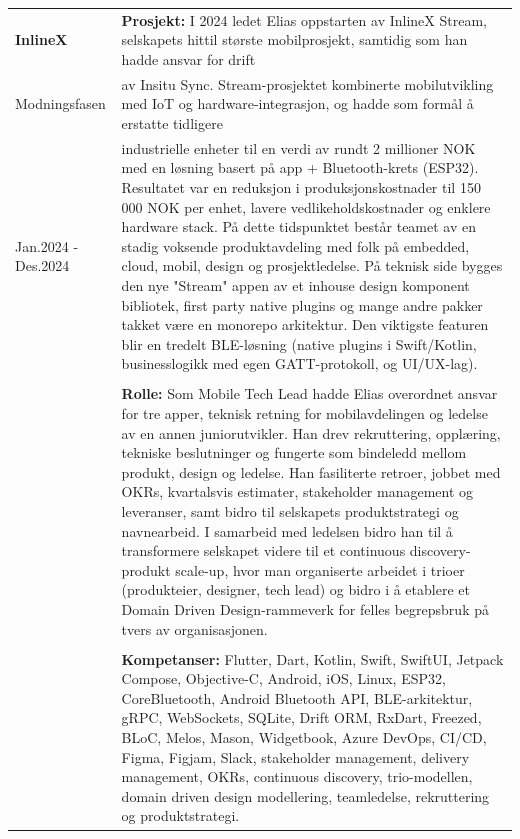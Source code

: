 \documentclass[a4paper,10pt]{article}
\begin{document}
\noindent
\begin{longtable}{@{}p{4cm}p{11cm}@{}}  %
\textbf{InlineX}
& \textbf{Prosjekt:} I 2024 ledet Elias oppstarten av InlineX Stream, selskapets hittil største mobilprosjekt, samtidig som han hadde ansvar for drift \\
Modningsfasen & av Insitu Sync. Stream-prosjektet kombinerte mobilutvikling med IoT og hardware-integrasjon, og hadde som formål å erstatte tidligere \\
Jan.2024 - Des.2024 & industrielle enheter til en verdi av rundt 2 millioner NOK med en løsning basert på app + Bluetooth-krets (ESP32). Resultatet var en reduksjon i produksjonskostnader til 150 000 NOK per enhet, lavere vedlikeholdskostnader og enklere hardware stack. På dette tidspunktet består teamet av en stadig voksende produktavdeling med folk på embedded, cloud, mobil, design og prosjektledelse. På teknisk side bygges den nye "Stream" appen av et inhouse design komponent bibliotek, first party native plugins og mange andre pakker takket være en monorepo arkitektur. Den viktigste featuren blir en tredelt BLE-løsning (native plugins i Swift/Kotlin, businesslogikk med egen GATT-protokoll, og UI/UX-lag).\\
& \\
&  \textbf{Rolle:} Som Mobile Tech Lead hadde Elias overordnet ansvar for tre apper, teknisk retning for mobilavdelingen og ledelse av en annen juniorutvikler. Han drev rekruttering, opplæring, tekniske beslutninger og fungerte som bindeledd mellom produkt, design og ledelse. Han fasiliterte retroer, jobbet med OKRs, kvartalsvis estimater, stakeholder management og leveranser, samt bidro til selskapets produktstrategi og navnearbeid. I samarbeid med ledelsen bidro han til å transformere selskapet videre til et continuous discovery-produkt scale-up, hvor man organiserte arbeidet i trioer (produkteier, designer, tech lead) og bidro i å etablere et Domain Driven Design-rammeverk for felles begrepsbruk på tvers av organisasjonen. \\
& \\
& \textbf{Kompetanser:} Flutter, Dart, Kotlin, Swift, SwiftUI, Jetpack Compose, Objective-C, Android, iOS, Linux, ESP32, CoreBluetooth, Android Bluetooth API, BLE-arkitektur, gRPC, WebSockets, SQLite, Drift ORM, RxDart, Freezed, BLoC, Melos, Mason, Widgetbook, Azure DevOps, CI/CD, Figma, Figjam, Slack, stakeholder management, delivery management, OKRs, continuous discovery, trio-modellen, domain driven design modellering, teamledelse, rekruttering og produktstrategi.\\
\end{longtable}
\end{document}
